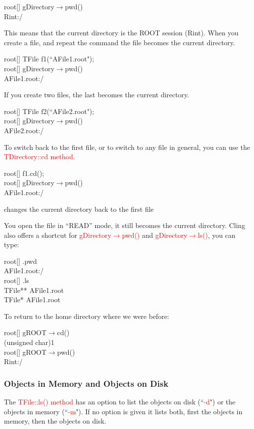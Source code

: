 \documentclass[12pt,a4paper]{article}
\begin{document}
root[] gDirectory$\rightarrow$pwd() \\
Rint:/

This means that the current directory is the ROOT session (Rint). When you create a file, and repeat the command the file becomes the current directory.

root[] TFile f1(``AFile1.root"); \\
root[] gDirectory$\rightarrow$pwd() \\
AFile1.root:/

If you create two files, the last becomes the current directory.

root[] TFile f2(``AFile2.root"); \\
root[] gDirectory$\rightarrow$pwd() \\
AFile2.root:/

To switch back to the first file, or to switch to any file in general, you can use the \textcolor{red}{TDirectory::cd method}.

root[] f1.cd(); \\
root[] gDirectory$\rightarrow$pwd() \\
AFile1.root:/

changes the current directory back to the first file

You open the file in ``READ” mode, it still becomes the current directory. Cling also offers a shortcut for \textcolor{red}{gDirectory$\rightarrow$pwd()} and \textcolor{red}{gDirectory$\rightarrow$ls()}, you can type:

root[] .pwd \\
AFile1.root:/ \\
root[] .ls \\
TFile** AFile1.root \\
TFile* AFile1.root

To return to the home directory where we were before:

root[] gROOT$\rightarrow$cd() \\
(unsigned char)1 \\
root[] gROOT$\rightarrow$pwd() \\
Rint:/

\subsubsection{Objects in Memory and Objects on Disk}
The \textcolor{red}{TFile::ls() method} has an option to list the objects on disk (``\textcolor{red}{-d}") or the objects in memory (``\textcolor{red}{-m}"). If no option is given it lists both, first the objects in memory, then the objects on disk.
\end{document}
